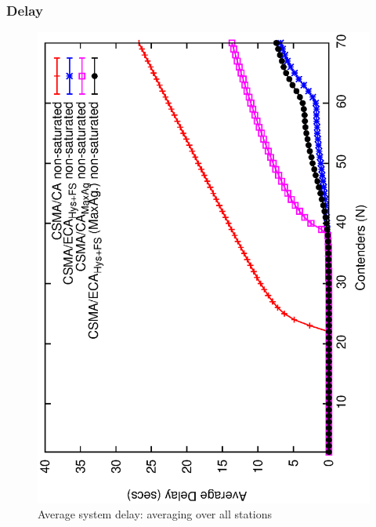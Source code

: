 	
	\subsubsection{Delay}
	
	\begin{figure}[tb]
		\centering
		\includegraphics[width=0.7\linewidth,angle=-90]{figures/unsaturated/queueingDelay/queueingDelay-multiplot.eps}
		\caption{Average system delay: averaging over all stations}
		\label{fig:serviceTime-unsat}
	\end{figure}
	
